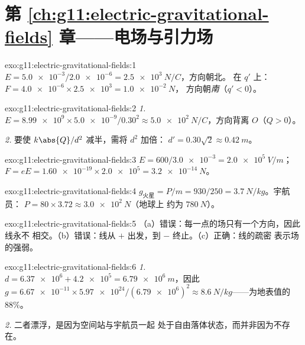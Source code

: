 \section*{第 \ref{ch:g11:electric-gravitational-fields} 章——电场与引力场}

\begin{solution}{exo:g11:electric-gravitational-fields:1}
$E = \num{5.0e-3} / \num{2.0e-6} = \qty{2.5e3}{N/C}$，方向朝北。
在 $q'$ 上：$F = \num{4.0e-6} \times \num{2.5e3} = \qty{1.0e-2}{N}$，
方向朝\emph{南}（$q' < 0$）。
\end{solution}

\begin{solution}{exo:g11:electric-gravitational-fields:2}
\emph{1.} $E = \num{8.99e9} \times \num{5.0e-9} / 0.30^2
\approx \qty{5.0e2}{N/C}$，方向背离 $O$（$Q > 0$）。

\emph{2.} 要使 $k\abs{Q}/d^2$ 减半，需将 $d^2$ 加倍：
$d' = 0.30\sqrt{2} \approx \qty{0.42}{m}$。
\end{solution}

\begin{solution}{exo:g11:electric-gravitational-fields:3}
$E = 600 / \num{3.0e-3} = \qty{2.0e5}{V/m}$；
$F = eE = \num{1.60e-19} \times \num{2.0e5} = \qty{3.2e-14}{N}$。
\end{solution}

\begin{solution}{exo:g11:electric-gravitational-fields:4}
$g_{\text{火星}} = P/m = 930/250 = \qty{3.7}{N/kg}$。宇航员：
$P = 80 \times 3.72 \approx \qty{3.0e2}{N}$（地球上
约为 $\qty{780}{N}$）。
\end{solution}

\begin{solution}{exo:g11:electric-gravitational-fields:5}
（a）错误：每一点的场只有一个方向，因此线永不
相交。（b）错误：线从 $+$ 出发，到 $-$ 终止。（c）正确：线的疏密
表示场的强弱。
\end{solution}

\begin{solution}{exo:g11:electric-gravitational-fields:6}
\emph{1.} $d = \num{6.37e6} + \num{4.2e5} = \qty{6.79e6}{m}$，因此
$g = \num{6.67e-11} \times \num{5.97e24} / (\num{6.79e6})^2
\approx \qty{8.6}{N/kg}$——为地表值的 $88\%$。

\emph{2.} 二者漂浮，是因为空间站与宇航员一起
处于自由落体状态，而并非因为不存在。
\end{solution}

